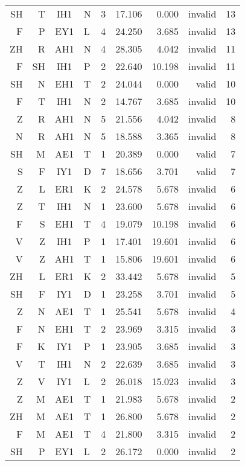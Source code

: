 \begin{longtable}{r@{ }r@{ }c@{ }l@{ } rrrrr}
SH &  T & IH1 & N  &  3 & 17.106 &  0.000 & invalid & 13 \\
 F &  P & EY1 & L  &  4 & 24.250 &  3.685 & invalid & 13 \\
ZH &  R & AH1 & N  &  4 & 28.305 &  4.042 & invalid & 11 \\
 F & SH & IH1 & P  &  2 & 22.640 & 10.198 & invalid & 11 \\
SH &  N & EH1 & T  &  2 & 24.044 &  0.000 &   valid & 10 \\
 F &  T & IH1 & N  &  2 & 14.767 &  3.685 & invalid & 10 \\
 Z &  R & AH1 & N  &  5 & 21.556 &  4.042 & invalid &  8 \\
 N &  R & AH1 & N  &  5 & 18.588 &  3.365 & invalid &  8 \\
SH &  M & AE1 & T  &  1 & 20.389 &  0.000 &   valid &  7 \\
 S &  F & IY1 & D  &  7 & 18.656 &  3.701 &   valid &  7 \\
 Z &  L & ER1 & K  &  2 & 24.578 &  5.678 & invalid &  6 \\
 Z &  T & IH1 & N  &  1 & 23.600 &  5.678 & invalid &  6 \\
 F &  S & EH1 & T  &  4 & 19.079 & 10.198 & invalid &  6 \\
 V &  Z & IH1 & P  &  1 & 17.401 & 19.601 & invalid &  6 \\
 V &  Z & AH1 & T  &  1 & 15.806 & 19.601 & invalid &  6 \\
ZH &  L & ER1 & K  &  2 & 33.442 &  5.678 & invalid &  5 \\
SH &  F & IY1 & D  &  1 & 23.258 &  3.701 & invalid &  5 \\
 Z &  N & AE1 & T  &  1 & 25.541 &  5.678 & invalid &  4 \\
 F &  N & EH1 & T  &  2 & 23.969 &  3.315 & invalid &  3 \\
 F &  K & IY1 & P  &  1 & 23.905 &  3.685 & invalid &  3 \\
 V &  T & IH1 & N  &  2 & 22.639 &  3.685 & invalid &  3 \\
 Z &  V & IY1 & L  &  2 & 26.018 & 15.023 & invalid &  3 \\
 Z &  M & AE1 & T  &  1 & 21.983 &  5.678 & invalid &  2 \\
ZH &  M & AE1 & T  &  1 & 26.800 &  5.678 & invalid &  2 \\
 F &  M & AE1 & T  &  4 & 21.800 &  3.315 & invalid &  2 \\
SH &  P & EY1 & L  &  2 & 26.172 &  0.000 & invalid &  2 \\

\end{longtable}
